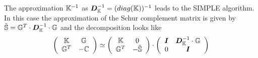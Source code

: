The approximation ${\mathbb{K}}^{-1}$ as ${\bm D}_{\mathbb{K}}^{-1} = (diag({\mathbb{K}}))^{-1}$ leads to the 
SIMPLE algorithm. In this case the approximation of the Schur complement matrix is given by
$\tilde{{\mathbb{S}}} = {\mathbb{G}}^T\cdot  {\bm D}_{\mathbb{K}}^{-1} \cdot {\mathbb{G}}$  and the decomposition looks like
\[
\left(
\begin{array}{cc}
{\mathbb{K}} & {\mathbb{G}} \\ {\mathbb{G}}^T & -{\mathbb{C}} 
\end{array}
\right)
\simeq
\left(
\begin{array}{cc}
{\mathbb{K}} & 0 \\ 
{\mathbb{G}}^T & -\tilde{{\mathbb{S}}}
\end{array}
\right)
\cdot
\left(
\begin{array}{cc}
{\bm I} & {\bm D}_{\mathbb{K}}^{-1} \cdot {\mathbb{G}} \\
0 & {\bm I} 
\end{array}
\right)
\]

